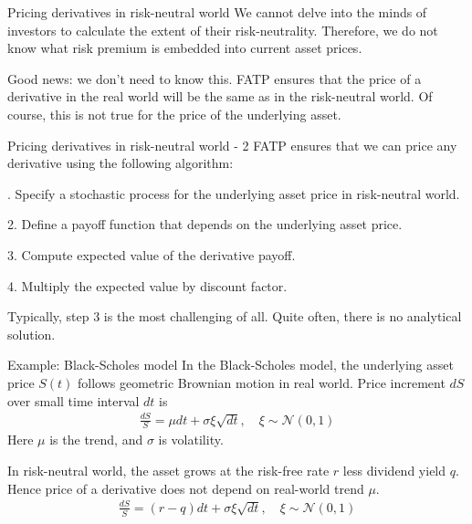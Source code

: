 \documentclass{beamer}
\begin{document}
\begin{frame}{Pricing derivatives in risk-neutral world}
\justify
We cannot delve into the minds of investors to calculate the extent of their risk-neutrality. Therefore, we do not know what risk premium is embedded into current asset prices.

\justify
Good news: we don't need to know this. FATP ensures that the price of a derivative in the real world will be the same as in the risk-neutral world. Of course, this is not true for the price of the underlying asset.
\end{frame}



\begin{frame}{Pricing derivatives in risk-neutral world - 2}
\justify
FATP ensures that we can price any derivative using the following algorithm:

. Specify a stochastic process for the underlying asset price in risk-neutral world.

2. Define a payoff function that depends on the underlying asset price.

3. Compute expected value of the derivative payoff.

4. Multiply the expected value by discount factor.

\justify
Typically, step 3 is the most challenging of all. Quite often, there is no analytical solution.
\end{frame}



\begin{frame}{Example: Black-Scholes model}
\justify
In the Black-Scholes model, the underlying asset price $S(t)$ follows geometric Brownian motion in real world. Price increment $dS$ over small time interval $dt$ is
\begin{align*}
\frac{dS}{S} = \mu dt + \sigma  \xi \sqrt{dt}, \quad \xi \sim \mathcal{N}(0,1) 
\end{align*}
Here $\mu$ is the trend, and $\sigma$ is volatility.

\justify
In risk-neutral world, the asset grows at the risk-free rate $r$ less dividend yield $q$. Hence price of a derivative does not depend on real-world trend $\mu$.
\begin{align*}
\frac{dS}{S} = (r - q)dt + \sigma \xi \sqrt{dt} , \quad \xi \sim \mathcal{N}(0,1) 
\end{align*}
\end{frame}
\end{document}
